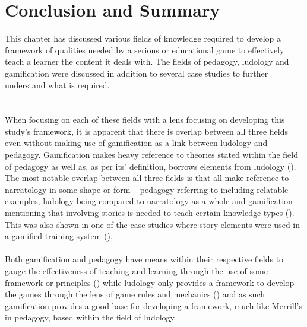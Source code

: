\section{Conclusion and Summary}
This chapter has discussed various fields of knowledge required to develop a framework of qualities needed by a serious or educational game to effectively teach a learner the content it deals with. The fields of pedagogy, ludology and gamification were discussed in addition to several case studies to further understand what is required. 
\\\\\\
When focusing on each of these fields with a lens focusing on developing this study’s framework, it is apparent that there is overlap between all three fields even without making use of gamification as a link between ludology and pedagogy. Gamification makes heavy reference to theories stated within the field of pedagogy as well as, as per its’ definition, borrows elements from ludology (\cite{KappArticle2012}). The most notable overlap between all three fields is that all make reference to narratology in some shape or form – pedagogy referring to including relatable examples, ludology being compared to narratology as a whole and gamification mentioning that involving stories is needed to teach certain knowledge types (\cite{Dincelli2020, Frasca2013, Kapp2012a, Sheng2007}). This was also shown in one of the case studies where story elements were used in a gamified training system (\cite{Dincelli2020, Sheng2007}). 
\\\\
Both gamification and pedagogy have means within their respective fields to gauge the effectiveness of teaching and learning through the use of some framework or principles (\cite{Kapp2012a, Merrill2002, Reigeluth1996}) while ludology only provides a framework to develop the games through the lens of game rules and mechanics (\cite{DeGloria2014}) and as such gamification provides a good base for developing a framework, much like Merrill’s in pedagogy, based within the field of ludology.



